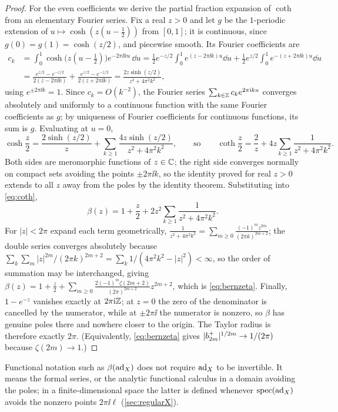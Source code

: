 \begin{proof}
For the even coefficients we derive the partial fraction expansion of
$\coth$ from an elementary Fourier series. Fix a real $z>0$ and let $g$ be
the $1$-periodic extension of $u\mapsto\cosh(z(u-\tfrac12))$ from $[0,1]$;
it is continuous, since $g(0)=g(1)=\cosh(z/2)$, and piecewise smooth. Its
Fourier coefficients are
\begin{align*}
 c_k&=\int_0^1\cosh\bigl(z(u-\tfrac12)\bigr)e^{-2\pi\ii ku}\,\dd u
 =\frac12e^{-z/2}\int_0^1e^{(z-2\pi\ii k)u}\dd u
  +\frac12e^{z/2}\int_0^1e^{-(z+2\pi\ii k)u}\dd u\\
 &=\frac{e^{z/2}-e^{-z/2}}{2(z-2\pi\ii k)}
  +\frac{e^{z/2}-e^{-z/2}}{2(z+2\pi\ii k)}
 =\frac{2z\sinh(z/2)}{z^2+4\pi^2k^2},
\end{align*}
using $e^{\pm2\pi\ii k}=1$. Since $c_k=O(k^{-2})$, the Fourier series
$\sum_{k\in\mathbb{Z}}c_ke^{2\pi\mathrm{i} ku}$ converges absolutely and uniformly to a
continuous function with the same Fourier coefficients as $g$; by uniqueness
of Fourier coefficients for continuous functions, its sum is $g$. Evaluating
at $u=0$,
\[
 \cosh\frac z2=\frac{2\sinh(z/2)}{z}+\sum_{k\geq1}\frac{4z\sinh(z/2)}{z^2+4\pi^2k^2},
 \qquad\text{so}\qquad
 \coth\frac z2=\frac2z+4z\sum_{k\geq1}\frac1{z^2+4\pi^2k^2}.
\]
Both sides are meromorphic functions of $z\in\mathbb{C}$; the right side converges
normally on compact sets avoiding the points $\pm2\pi\ii k$, so the identity
proved for real $z>0$ extends to all $z$ away from the poles by the identity
theorem. Substituting into \eqref{eq:coth},
\begin{equation}\label{eq:partialfractions}
 \beta(z)=1+\frac z2+2z^2\sum_{k\geq1}\frac1{z^2+4\pi^2k^2}.
\end{equation}
For $|z|<2\pi$ expand each term geometrically,
$\frac{1}{z^2+4\pi^2k^2}=\sum_{m\geq0}\frac{(-1)^mz^{2m}}{(2\pi k)^{2m+2}}$;
the double series converges absolutely because
$\sum_k\sum_m|z|^{2m}/(2\pi k)^{2m+2}=\sum_k1/(4\pi^2k^2-|z|^2)<\infty$, so
the order of summation may be interchanged, giving
$\beta(z)=1+\frac z2+\sum_{m\geq0}\frac{2(-1)^m\zeta(2m+2)}{(2\pi)^{2m+2}}z^{2m+2}$,
which is \eqref{eq:bernzeta}. Finally, $1-e^{-z}$ vanishes exactly at
$2\pi\mathrm{i}\mathbb{Z}$; at $z=0$ the zero of the denominator is cancelled by the
numerator, while at $\pm2\pi\ii$ the numerator is nonzero, so $\beta$ has
genuine poles there and nowhere closer to the origin. The Taylor radius is
therefore exactly $2\pi$. (Equivalently, \eqref{eq:bernzeta} gives
$|b^{+}_{2m}|^{1/2m}\to1/(2\pi)$ because $\zeta(2m)\to1$.)
\end{proof}
Functional notation such as $\beta(\operatorname{ad}_X)$ does not require $\operatorname{ad}_X$ to be
invertible. It means the formal series, or the analytic functional calculus in
a domain avoiding the poles; in a finite-dimensional space the latter is
defined whenever $\operatorname{spec}(\operatorname{ad}_X)$ avoids the nonzero points $2\pi\ii\ell$
(\cref{sec:regularX}).


